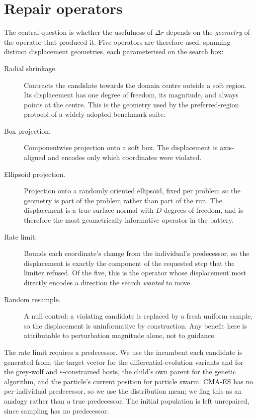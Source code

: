 \documentclass[11pt,a4paper]{article}
\begin{document}
\section{Repair operators}
\label{sec:method}

The central question is whether the usefulness of $\Delta r$ depends on the
\emph{geometry} of the operator that produced it. Five operators are therefore used,
spanning distinct displacement geometries, each parameterised on the search box:

\begin{description}
\item[Radial shrinkage.] Contracts the candidate towards the domain centre outside a soft
  region. Its displacement has one degree of freedom, its magnitude, and always points at
  the centre. This is the geometry used by the preferred-region protocol of a widely
  adopted benchmark suite.
\item[Box projection.] Componentwise projection onto a soft box. The displacement is
  axis-aligned and encodes only which coordinates were violated.
\item[Ellipsoid projection.] Projection onto a randomly oriented ellipsoid, fixed per
  problem so the geometry is part of the problem rather than part of the run. The
  displacement is a true surface normal with $D$ degrees of freedom, and is therefore the
  most geometrically informative operator in the battery.
\item[Rate limit.] Bounds each coordinate's change from the individual's predecessor, so
  the displacement is exactly the component of the requested step that the limiter
  refused. Of the five, this is the operator whose displacement most directly encodes a
  direction the search \emph{wanted} to move.
\item[Random resample.] A null control: a violating candidate is replaced by a fresh
  uniform sample, so the displacement is uninformative by construction. Any benefit here
  is attributable to perturbation magnitude alone, not to guidance.
\end{description}

The rate limit requires a predecessor. We use the incumbent each candidate is generated
from: the target vector for the differential-evolution variants and for the grey-wolf and
$\varepsilon$-constrained hosts, the child's own parent for the genetic algorithm, and the
particle's current position for particle swarm. CMA-ES has no per-individual predecessor,
so we use the distribution mean; we flag this as an analogy rather than a true
predecessor. The initial population is left unrepaired, since sampling has no
predecessor.
\end{document}
